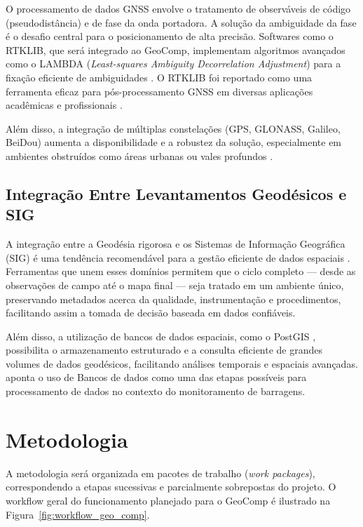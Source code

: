 \documentclass[
        12pt,                           %
        openright,                      %
        oneside,
        a4paper,                        %
        chapter=TITLE,         %
        section=TITLE,         %
        subsection=Title,      %
        english,                        %
        portugues,                      %
        ]{abntex2}
\begin{document}
O processamento de dados GNSS envolve o tratamento de observáveis de código (pseudodistância) e de fase da onda portadora. A solução da ambiguidade da fase é o desafio central para o posicionamento de alta precisão. Softwares como o RTKLIB, que será integrado ao GeoComp, implementam algoritmos avançados como o LAMBDA (\textit{Least-squares Ambiguity Decorrelation Adjustment}) para a fixação eficiente de ambiguidades \cite{rtklib_manual}. O RTKLIB foi reportado como uma ferramenta eficaz para pós-processamento GNSS em diversas aplicações acadêmicas e profissionais \cite{Angrisano2020_PPP_OpenSource,Diouf2023_RTKLIB_Comparative}.

Além disso, a integração de múltiplas constelações (GPS, GLONASS, Galileo, BeiDou) aumenta a disponibilidade e a robustez da solução, especialmente em ambientes obstruídos como áreas urbanas ou vales profundos \cite{seeber_satellite, monico_gnss}.





\section{Integração Entre Levantamentos Geodésicos e SIG}

A integração entre a Geodésia rigorosa e os Sistemas de Informação Geográfica (SIG) é uma tendência recomendável para a gestão eficiente de dados espaciais \cite{monico_gnss}. Ferramentas que unem esses domínios permitem que o ciclo completo — desde as observações de campo até o mapa final — seja tratado em um ambiente único, preservando metadados acerca da qualidade, instrumentação e procedimentos, facilitando assim a tomada de decisão baseada em dados confiáveis.

Além disso, a utilização de bancos de dados espaciais, como o PostGIS \cite{postgis_manual}, possibilita o armazenamento estruturado e a consulta eficiente de grandes volumes de dados geodésicos, facilitando análises temporais e espaciais avançadas.  aponta o uso de Bancos de dados como uma das etapas possíveis para processamento de dados no contexto do monitoramento de barragens.





\chapter{Metodologia}

A metodologia será organizada em pacotes de trabalho (\textit{work packages}), correspondendo a etapas sucessivas e parcialmente sobrepostas do projeto. O workflow geral do funcionamento planejado para o GeoComp é ilustrado na Figura~\ref{fig:workflow_geo_comp}.
\end{document}
